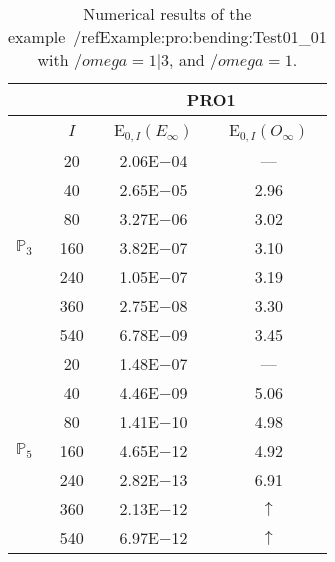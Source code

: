 \begin{table}[H]
\caption{Numerical results of the example~/ref{Example:pro:bending:Test01_01} with $/omega=1|3$, and $/omega=1$.}
\setlength{\tabcolsep}{5pt}
\centering
\begin{tabular}{@{}l c c c@{}}
\toprule
 &  & \multicolumn{2}{c}{PRO1}\\
\midrule
 & $I$ & E$_{0,I}(E_{\infty})$ & E$_{0,I}(O_{\infty})$\\
\midrule
\multirow{7}{*}{$\mathbb{P}_{3}$}
 & 20 & 2.06E$-$04 & ---\\
 & 40 & 2.65E$-$05 & 2.96\\
 & 80 & 3.27E$-$06 & 3.02\\
 & 160 & 3.82E$-$07 & 3.10\\
 & 240 & 1.05E$-$07 & 3.19\\
 & 360 & 2.75E$-$08 & 3.30\\
 & 540 & 6.78E$-$09 & 3.45\\
\midrule
\multirow{7}{*}{$\mathbb{P}_{5}$}
 & 20 & 1.48E$-$07 & ---\\
 & 40 & 4.46E$-$09 & 5.06\\
 & 80 & 1.41E$-$10 & 4.98\\
 & 160 & 4.65E$-$12 & 4.92\\
 & 240 & 2.82E$-$13 & 6.91\\
 & 360 & 2.13E$-$12 & $\uparrow$\\
 & 540 & 6.97E$-$12 & $\uparrow$\\
\bottomrule
\end{tabular}
\label{Table:pRO:test_01_01_test6_pro2}
\end{table}
